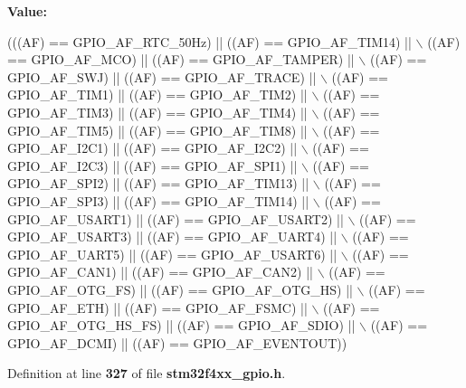 {\bfseries Value\+:}
\begin{DoxyCode}
(((AF) == GPIO_AF_RTC_50Hz)  || ((AF) == GPIO_AF_TIM14)  || \(\backslash\)
                          ((AF) == GPIO_AF_MCO)       || ((AF) == GPIO_AF_TAMPER) || \(\backslash\)
                          ((AF) == GPIO_AF_SWJ)       || ((AF) == GPIO_AF_TRACE)  || \(\backslash\)
                          ((AF) == GPIO_AF_TIM1)      || ((AF) == GPIO_AF_TIM2)   || \(\backslash\)
                          ((AF) == GPIO_AF_TIM3)      || ((AF) == GPIO_AF_TIM4)   || \(\backslash\)
                          ((AF) == GPIO_AF_TIM5)      || ((AF) == GPIO_AF_TIM8)   || \(\backslash\)
                          ((AF) == GPIO_AF_I2C1)      || ((AF) == GPIO_AF_I2C2)   || \(\backslash\)
                          ((AF) == GPIO_AF_I2C3)      || ((AF) == GPIO_AF_SPI1)   || \(\backslash\)
                          ((AF) == GPIO_AF_SPI2)      || ((AF) == GPIO_AF_TIM13)  || \(\backslash\)
                          ((AF) == GPIO_AF_SPI3)      || ((AF) == GPIO_AF_TIM14)  || \(\backslash\)
                          ((AF) == GPIO_AF_USART1)    || ((AF) == GPIO_AF_USART2) || \(\backslash\)
                          ((AF) == GPIO_AF_USART3)    || ((AF) == GPIO_AF_UART4)  || \(\backslash\)
                          ((AF) == GPIO_AF_UART5)     || ((AF) == GPIO_AF_USART6) || \(\backslash\)
                          ((AF) == GPIO_AF_CAN1)      || ((AF) == GPIO_AF_CAN2)   || \(\backslash\)
                          ((AF) == GPIO_AF_OTG_FS)    || ((AF) == GPIO_AF_OTG_HS) || \(\backslash\)
                          ((AF) == GPIO_AF_ETH)       || ((AF) == GPIO_AF_FSMC)   || \(\backslash\)
                          ((AF) == GPIO_AF_OTG_HS_FS) || ((AF) == GPIO_AF_SDIO)   || \(\backslash\)
                          ((AF) == GPIO_AF_DCMI)      || ((AF) == 
      GPIO_AF_EVENTOUT))
\end{DoxyCode}


Definition at line \textbf{ 327} of file \textbf{ stm32f4xx\+\_\+gpio.\+h}.

